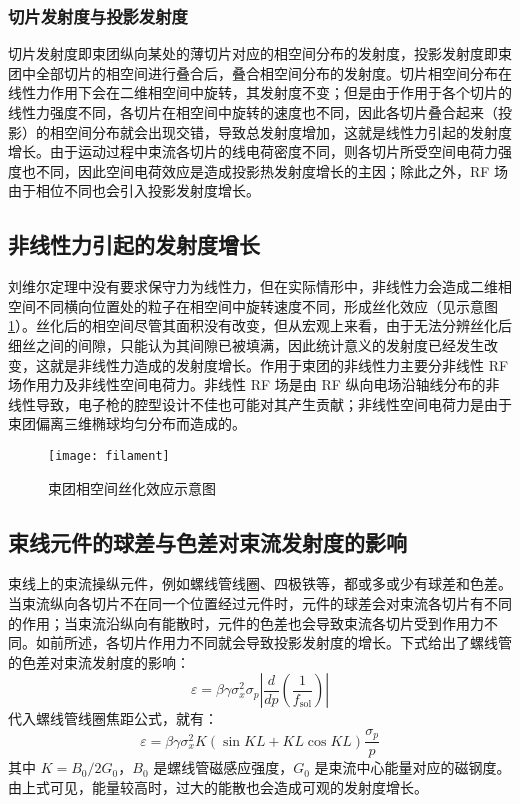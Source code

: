 \subsubsection{切片发射度与投影发射度}
切片发射度即束团纵向某处的薄切片对应的相空间分布的发射度，投影发射度即束团中全部切片的相空间进行叠合后，叠合相空间分布的发射度。切片相空间分布在线性力作用下会在二维相空间中旋转，其发射度不变；但是由于作用于各个切片的线性力强度不同，各切片在相空间中旋转的速度也不同，因此各切片叠合起来（投影）的相空间分布就会出现交错，导致总发射度增加，这就是线性力引起的发射度增长。由于运动过程中束流各切片的线电荷密度不同，则各切片所受空间电荷力强度也不同，因此空间电荷效应是造成投影热发射度增长的主因；除此之外，RF 场由于相位不同也会引入投影发射度增长。

\subsection{非线性力引起的发射度增长}
刘维尔定理中没有要求保守力为线性力，但在实际情形中，非线性力会造成二维相空间不同横向位置处的粒子在相空间中旋转速度不同，形成丝化效应（见示意图 \ref{fig:filament}）。丝化后的相空间尽管其面积没有改变，但从宏观上来看，由于无法分辨丝化后细丝之间的间隙，只能认为其间隙已被填满，因此统计意义的发射度已经发生改变，这就是非线性力造成的发射度增长。作用于束团的非线性力主要分非线性 RF 场作用力及非线性空间电荷力。非线性 RF 场是由 RF 纵向电场沿轴线分布的非线性导致，电子枪的腔型设计不佳也可能对其产生贡献；非线性空间电荷力是由于束团偏离三维椭球均匀分布而造成的。
\begin{figure}[htbp]
\centering
\texttt{[image: filament]}
\caption{\label{fig:filament} 束团相空间丝化效应示意图\cite{Baartman:2000aa}}
\end{figure}

\subsection{束线元件的球差与色差对束流发射度的影响}
束线上的束流操纵元件，例如螺线管线圈、四极铁等，都或多或少有球差和色差。当束流纵向各切片不在同一个位置经过元件时，元件的球差会对束流各切片有不同的作用；当束流沿纵向有能散时，元件的色差也会导致束流各切片受到作用力不同。如前所述，各切片作用力不同就会导致投影发射度的增长。下式给出了螺线管的色差对束流发射度的影响\cite{Dowell:2010ab}：
\begin{equation}
\varepsilon = \beta\gamma\sigma_x^2\sigma_p\left|\frac{d}{dp}\left(\frac{1}{f_{\text{sol}}}\right)\right|
\end{equation}
代入螺线管线圈焦距公式，就有：
\begin{equation}
\varepsilon = \beta\gamma\sigma_x^2K(\sin KL+KL\cos KL)\frac{\sigma_p}{p}
\end{equation}
其中 $K = B_0/2G_0$，$B_0$ 是螺线管磁感应强度，$G_0$ 是束流中心能量对应的磁钢度。由上式可见，能量较高时，过大的能散也会造成可观的发射度增长。

